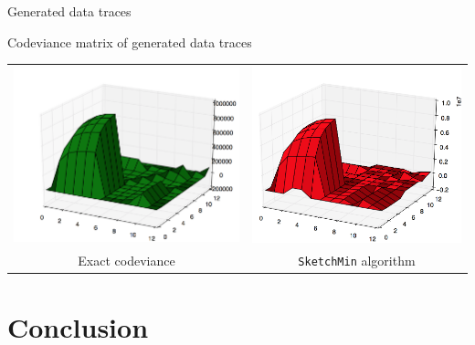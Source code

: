 \documentclass[mathserif]{beamer}
\begin{document}
	\begin{frame}{Generated data traces}
	
	\begin{center}
		\begin{block}{Codeviance matrix of generated data traces}
		\end{block}
		\begin{tabular}{cc}
			\includegraphics[scale=0.16]{generated_real.png} &
			\includegraphics[scale=0.16]{generated_sk.png} \\
			Exact codeviance & \texttt{SketchMin} algorithm \\
		\end{tabular}
	\end{center}
		
	\end{frame}

\section*{Conclusion}

	\begin{frame}
	
	\end{frame}
\end{document}
